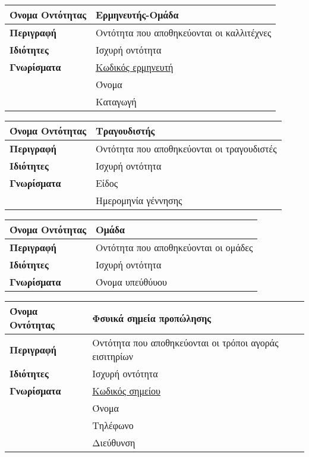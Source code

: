 \begin{center}
\begin{tabular}[]{|p{4cm}|p{10cm}|}
\hline
\hline
\textbf{Όνομα Οντότητας}   &  Ερμηνευτής-Ομάδα \\ \hline 
\textbf{Περιγραφή}         &  Οντότητα που αποθηκεύονται οι καλλιτέχνες \\ \hline 
\textbf{Ιδιότητες}         &  Ισχυρή οντότητα    \\    \hline           
\textbf{Γνωρίσματα}        &  \underline{Κωδικός ερμηνευτή}\\
                           &  Όνομα  \\
           ~               &  Καταγωγή \\
\hline
\end{tabular}
\vspace{0.3 cm}

\begin{tabular}[]{|p{4cm}|p{10cm}|} 
 \hline
\textbf{Όνομα Οντότητας}   &  Τραγουδιστής \\ \hline 
\textbf{Περιγραφή}         &  Οντότητα που αποθηκεύονται οι τραγουδιστές\\ \hline 
\textbf{Ιδιότητες}         &  Ισχυρή οντότητα    \\    \hline           
\textbf{Γνωρίσματα}        &  Είδος \\
                           &  Ημερομηνία γέννησης \\
\hline 
\end{tabular}
\vspace{0.3 cm}

\begin{tabular}[]{|p{4cm}|p{10cm}|}
\hline
\textbf{Όνομα Οντότητας}   &  Ομάδα \\ \hline 
\textbf{Περιγραφή}         &  Οντότητα που αποθηκεύονται οι ομάδες \\ \hline 
\textbf{Ιδιότητες}         &  Ισχυρή οντότητα    \\    \hline           
\textbf{Γνωρίσματα}        &  Όνομα υπεύθύυου\\
\hline 
\end{tabular}
\vspace{0.3 cm}

\begin{tabular}[]{|p{4cm}|p{10cm}|}
 \hline
\textbf{Όνομα Οντότητας}   &  Φσυικά σημεία προπώλησης \\ \hline 
\textbf{Περιγραφή}         &  Οντότητα που αποθηκεύονται οι τρόποι αγοράς εισιτηρίων \\\hline 
\textbf{Ιδιότητες}         &  Ισχυρή οντότητα \\       \hline           
\textbf{Γνωρίσματα}        &  \underline{Κωδικός σημείου} \\
                           &  Όνομα \\
                           &  Τηλέφωνο \\
                           &  Διεύθυνση \\ 
\hline 
\end{tabular}
\vspace{0.3 cm}


\end{center}
